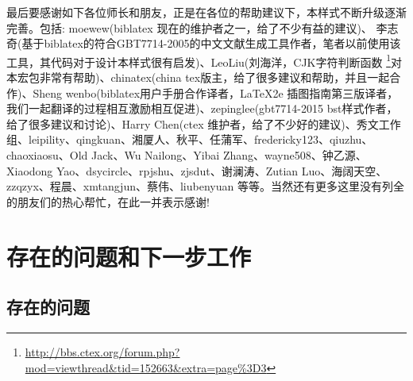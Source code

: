 最后要感谢如下各位师长和朋友，正是在各位的帮助建议下，本样式不断升级逐渐完善。包括: moewew(biblatex 现在的维护者之一，给了不少有益的建议)、 李志奇(基于biblatex的符合GBT7714-2005的中文文献生成工具作者，笔者以前使用该工具，其代码对于设计本样式很有启发)、LeoLiu(刘海洋，CJK字符判断函数
\footnote{\url{http://bbs.ctex.org/forum.php?mod=viewthread&tid=152663&extra=page\%3D3}}对本宏包非常有帮助)、chinatex(china tex版主，给了很多建议和帮助，并且一起合作)、Sheng wenbo(biblatex用户手册合作译者，LaTeX2e 插图指南第三版译者，我们一起翻译的过程相互激励相互促进)、zepinglee(gbt7714-2015 bst样式作者，给了很多建议和讨论)、Harry Chen(ctex 维护者，给了不少好的建议)、秀文工作组、leipility、qingkuan、湘厦人、秋平、任蒲军、fredericky123、qiuzhu、chaoxiaosu、Old Jack、Wu Nailong、Yibai Zhang、wayne508、钟乙源、Xiaodong Yao、dsycircle、rpjshu、zjsdut、谢澜涛、Zutian Luo、海阔天空、zzqzyx、程晨、xmtangjun、蔡伟、liubenyuan 等等。当然还有更多这里没有列全的朋友们的热心帮忙，在此一并表示感谢!


\section{存在的问题和下一步工作}


\subsection{存在的问题}

